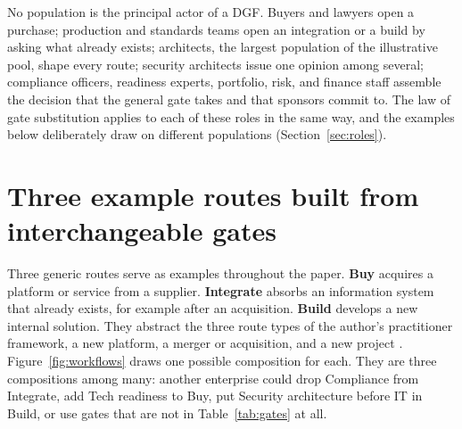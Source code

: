 No population is the principal actor of a DGF. Buyers and lawyers open a purchase; production and
standards teams open an integration or a build by asking what already exists; architects, the largest
population of the illustrative pool, shape every route; security architects issue one opinion among
several; compliance officers, readiness experts, portfolio, risk, and finance staff assemble the
decision that the general gate takes and that sponsors commit to. The law of gate substitution applies to each of
these roles in the same way, and the examples below deliberately draw on different populations
(Section~\ref{sec:roles}).

\section{Three example routes built from interchangeable gates}
\label{sec:workflows}

Three generic routes serve as examples throughout the paper. \textbf{Buy} acquires a platform or
service from a supplier. \textbf{Integrate} absorbs an information system that already exists, for
example after an acquisition. \textbf{Build} develops a new internal solution. They abstract the three
route types of the author's practitioner framework, a new platform, a merger or acquisition, and a new
project \citep[pp.~17--22]{canale2026}. Figure~\ref{fig:workflows} draws one possible composition for each. They are three
compositions among many: another enterprise could drop Compliance from Integrate, add Tech readiness to
Buy, put Security architecture before IT in Build, or use gates that are not in Table~\ref{tab:gates}
at all.

